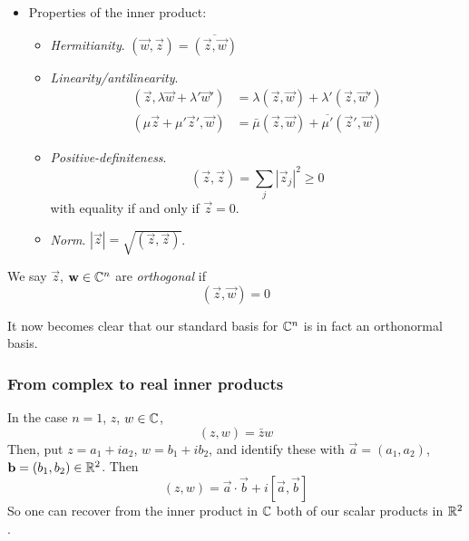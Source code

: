 \documentclass{../template/note}
\begin{document}
\begin{definition}
\begin{itemize}[resume]
            \item Properties of the inner product:
            \begin{itemize}
                \item \emph{Hermitianity}. \((\vec w, \vec z) = \overline{(\vec z, \vec w)}\) \\
                \item \emph{Linearity/antilinearity}.
                \begin{align*}
                    (\vec z, \lambda \vec w + \lambda ' \vec w') &= \lambda (\vec z, \vec w) + \lambda ' (\vec z, \vec w') \\
                    (\mu \vec z + \mu' \vec z', \vec w) &= \bar \mu (\vec z, \vec w) + \overline{\mu'}(\vec z', \vec w)
                \end{align*}
                \item \emph{Positive-definiteness}.
                \[
                    (\vec z, \vec z) = \sum_j |\vec z_j|^2 \geq 0
                \]
                with equality if and only if \(\vec z = 0\).
                \item \emph{Norm}. \(|\vec z| = \sqrt{(\vec z, \vec z)}\).
            \end{itemize}
        \end{itemize}
    \end{definition}

    \begin{definition}[Orthogonality in \(\CC^n\)]
        We say \(\vec z\), \(\vec w \in \CC^n\) are \emph{orthogonal} if
        \[
            (\vec z, \vec w) = 0
        \]
    \end{definition}
    
    \begin{remark}
        It now becomes clear that our standard basis for \(\CC^n\) is in fact an orthonormal basis.
    \end{remark}
    
    \subsubsection{From complex to real inner products}

    In the case \(n=1\), \(z\), \(w \in \mathbb C\),
    \[  
        (z, w) = \bar z w
    \]
    Then, put \(z = a_1 + ia_2\), \(w = b_1 + ib_2\), and identify these with \(\vec a = (a_1, a_2)\), \(\vec b = (b_1, b_2) \in \RR^2\). Then
    \[  
        (z, w) = \vec a \cdot \vec b + i [\vec a, \vec b]
    \]
    So one can recover from the inner product in \(\mathbb C\) both of our scalar products in \(\mathbb R^2\).
\end{document}

